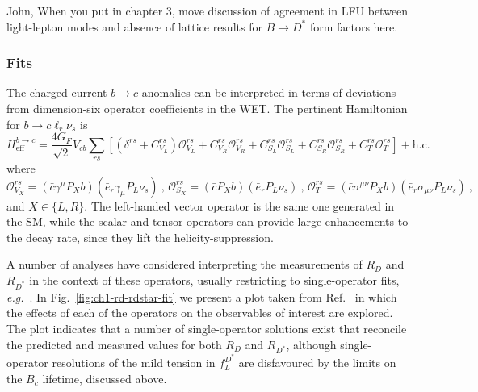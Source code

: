 {\color{red} John, When you put in chapter 3, move discussion of agreement in
  LFU between light-lepton modes and absence of lattice results for
  $B \to D^{*}$ form factors here.}

\subsubsection{Fits}

The charged-current $b \to c$ anomalies can be interpreted in terms of
deviations from dimension-six operator coefficients in the WET. The pertinent
Hamiltonian for $b \to c \ell_{r} \nu_{s}$ is
\begin{equation}
  \label{eq:ch1-bctaunu-ham}
  H^{b\to c}_{\text{eff}} = \frac{4 G_{F}}{\sqrt{2}} V_{cb} \sum_{rs} [(\delta^{rs} + C^{rs}_{V_{L}}) \mathcal{O}^{rs}_{V_{L}} + C_{V_{R}}^{rs} \mathcal{O}^{rs}_{V_{R}} + C^{rs}_{S_{L}}\mathcal{O}^{rs}_{S_{L}} + C^{rs}_{S_{R}}\mathcal{O}^{rs}_{S_{R}} + C^{rs}_{T}\mathcal{O}^{rs}_{T}] + \text{h.c.}
\end{equation}
where
\begin{equation}
    \mathcal{O}^{rs}_{V_{X}} = (\bar{c} \gamma^{\mu} P_{X} b) (\bar{e}_{r} \gamma_{\mu} P_{L} \nu_{s}) \ , \, \mathcal{O}^{rs}_{S_{X}} = (\bar{c} P_{X} b) (\bar{e}_{r} P_{L} \nu_{s}) \ , \, \mathcal{O}^{rs}_{T} = (\bar{c} \sigma^{\mu\nu} P_{X} b) (\bar{e}_{r} \sigma_{\mu\nu} P_{L} \nu_{s}) \ ,
\end{equation}
and $X \in \{L, R\}$. The left-handed vector operator is the same one generated
in the SM, while the scalar and tensor operators can provide large enhancements
to the decay rate, since they lift the helicity-suppression.

A number of analyses have considered interpreting the measurements of $R_{D}$
and $R_{D^{*}}$ in the context of these operators, usually restricting to
single-operator fits, \textit{e.g.}~\cite{Sakaki:2013bfa, Freytsis:2015qca,
  Jung:2018lfu, Azatov:2018knx, Angelescu:2018tyl, Huang:2018nnq,
  Murgui:2019czp}. In Fig.~\ref{fig:ch1-rd-rdstar-fit} we present a plot taken from
Ref.~\cite{Murgui:2019czp} in which the effects of each of the operators on the
observables of interest are explored. The plot indicates that a number of
single-operator solutions exist that reconcile the predicted and measured values
for both $R_{D}$ and $R_{D^{*}}$, although single-operator resolutions of the
mild tension in $f_{L}^{D^{*}}$ are disfavoured by the limits on the $B_{c}$
lifetime, discussed above.

